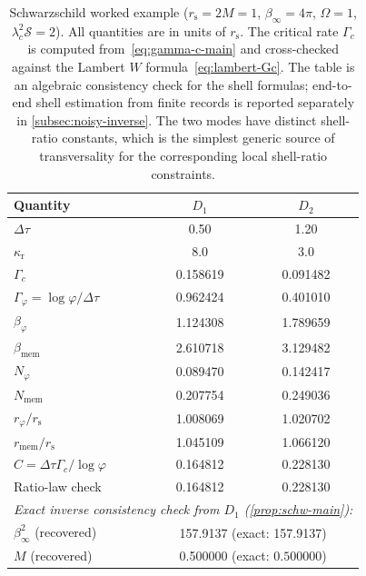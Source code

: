 \begin{table}[t]
\centering\small
\caption{Schwarzschild worked example ($r_{\mathrm s}=2M=1$, $\beta_\infty=4\pi$, $\Omega=1$, $\lambda_c^2\mathcal S=2$). All quantities are in units of $r_{\mathrm s}$. The critical rate $\Gamma_c$ is computed from~\eqref{eq:gamma-c-main} and cross-checked against the Lambert $W$ formula~\eqref{eq:lambert-Gc}. The table is an algebraic consistency check for the shell formulas; end-to-end shell estimation from finite records is reported separately in \cref{subsec:noisy-inverse}. The two modes have distinct shell-ratio constants, which is the simplest generic source of transversality for the corresponding local shell-ratio constraints.}
\label{tab:worked}
\begin{tabular}{l c c}
\toprule
Quantity & $D_1$ & $D_2$ \\
\midrule
$\Delta\tau$ & 0.50 & 1.20 \\
$\kappa_{\mathrm r}$ & 8.0 & 3.0 \\
$\Gamma_c$ & 0.158619 & 0.091482 \\
$\Gamma_\varphi = \log\varphi/\Delta\tau$ & 0.962424 & 0.401010 \\
$\beta_\varphi$ & 1.124308 & 1.789659 \\
$\beta_{\mathrm{mem}}$ & 2.610718 & 3.129482 \\
$N_\varphi$ & 0.089470 & 0.142417 \\
$N_{\mathrm{mem}}$ & 0.207754 & 0.249036 \\
$r_\varphi / r_{\mathrm s}$ & 1.008069 & 1.020702 \\
$r_{\mathrm{mem}} / r_{\mathrm s}$ & 1.045109 & 1.066120 \\
$C = \Delta\tau\Gamma_c / \log\varphi$ & 0.164812 & 0.228130 \\
Ratio-law check & 0.164812 & 0.228130 \\
\midrule
\multicolumn{3}{l}{\textit{Exact inverse consistency check from $D_1$ (\cref{prop:schw-main}):}} \\
$\beta_\infty^2$ (recovered) & \multicolumn{2}{c}{157.9137 (exact: 157.9137)} \\
$M$ (recovered) & \multicolumn{2}{c}{0.500000 (exact: $0.500000$)} \\
\bottomrule
\end{tabular}
\end{table}
